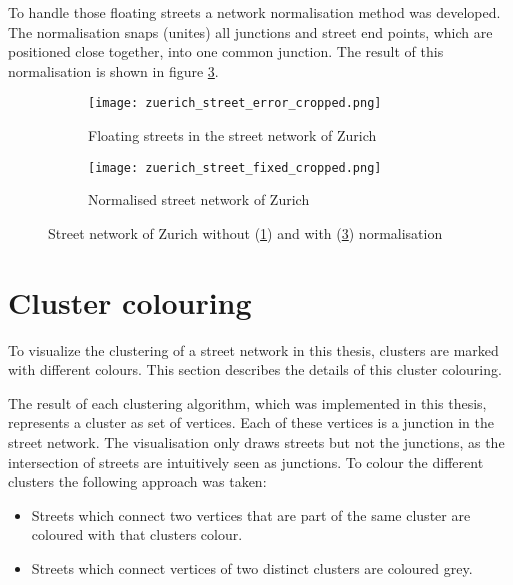To handle those floating streets a network normalisation method was developed. The normalisation snaps (unites) all junctions and street end points, which are positioned close together, into one common junction. The result of this normalisation is shown in figure \ref{fig:zuerich_fixed}.

\begin{figure}
    \centering
    \begin{subfigure}[b]{0.8\textwidth}
        \begin{mdframed}[style=mdthight]
            \texttt{[image: zuerich\_street\_error\_cropped.png]}
        \end{mdframed}
        \caption{Floating streets in the street network of Zurich}
        \label{fig:zuerich_error}
    \end{subfigure}
    \par\medskip
    \begin{subfigure}[b]{0.8\textwidth}
        \begin{mdframed}[style=mdthight]
            \texttt{[image: zuerich\_street\_fixed\_cropped.png]}
        \end{mdframed}
        \caption{Normalised street network of Zurich}
        \label{fig:zuerich_fixed}
    \end{subfigure}
    \caption{Street network of Zurich without (\ref{fig:zuerich_error}) and with (\ref{fig:zuerich_fixed}) normalisation}
\end{figure}

\section{Cluster colouring}
To visualize the clustering of a street network in this thesis, clusters are marked with different colours. This section describes the details of this cluster colouring.

The result of each clustering algorithm, which was implemented in this thesis, represents a cluster as set of vertices. Each of these vertices is a junction in the street network. The visualisation only draws streets but not the junctions, as the intersection of streets are intuitively seen as junctions. To colour the different clusters the following approach was taken:

\begin{itemize}
    \item Streets which connect two vertices that are part of the same cluster are coloured with that clusters colour.
    \item Streets which connect vertices of two distinct clusters are coloured grey.
\end{itemize}

